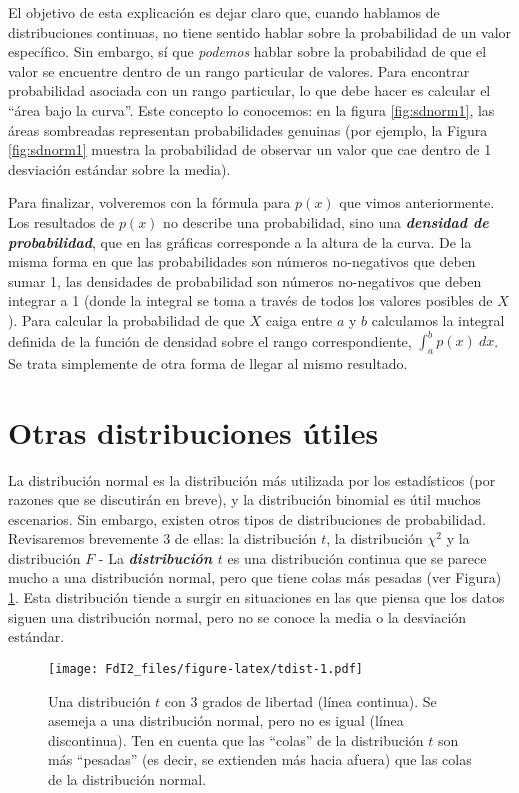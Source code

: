 \documentclass[spanish,]{book}
\begin{document}
El objetivo de esta explicación es dejar claro que, cuando hablamos de
distribuciones continuas, no tiene sentido hablar sobre la probabilidad
de un valor específico. Sin embargo, sí que \emph{podemos} hablar sobre
la probabilidad de que el valor se encuentre dentro de un rango
particular de valores. Para encontrar probabilidad asociada con un rango
particular, lo que debe hacer es calcular el ``área bajo la curva''.
Este concepto lo conocemos: en la figura \ref{fig:sdnorm1}, las áreas
sombreadas representan probabilidades genuinas (por ejemplo, la Figura
\ref{fig:sdnorm1} muestra la probabilidad de observar un valor que cae
dentro de 1 desviación estándar sobre la media).

Para finalizar, volveremos con la fórmula para \(p(x)\) que vimos
anteriormente. Los resultados de \(p(x)\) no describe una probabilidad,
sino una \textbf{\emph{densidad de probabilidad}}, que en las gráficas
corresponde a la altura de la curva. De la misma forma en que las
probabilidades son números no-negativos que deben sumar 1, las
densidades de probabilidad son números no-negativos que deben integrar a
1 (donde la integral se toma a través de todos los valores posibles de
\(X\)). Para calcular la probabilidad de que \(X\) caiga entre \(a\) y
\(b\) calculamos la integral definida de la función de densidad sobre el
rango correspondiente, \(\int_a^b p(x) \ dx\). Se trata simplemente de
otra forma de llegar al mismo resultado.

\section{Otras distribuciones útiles}\label{otherdists}

La distribución normal es la distribución más utilizada por los
estadísticos (por razones que se discutirán en breve), y la distribución
binomial es útil muchos escenarios. Sin embargo, existen otros tipos de
distribuciones de probabilidad. Revisaremos brevemente 3 de ellas: la
distribución \(t\), la distribución \(\chi^2\) y la distribución \(F\) -
La \textbf{\emph{distribución \(t\)}} es una distribución continua que
se parece mucho a una distribución normal, pero que tiene colas más
pesadas (ver Figura) \ref{fig:tdist}. Esta distribución tiende a surgir
en situaciones en las que piensa que los datos siguen una distribución
normal, pero no se conoce la media o la desviación estándar.

\begin{figure}
\centering
\texttt{[image: FdI2\_files/figure-latex/tdist-1.pdf]}
\caption{\label{fig:tdist}Una distribución \(t\) con 3 grados de libertad
(línea continua). Se asemeja a una distribución normal, pero no es igual
(línea discontinua). Ten en cuenta que las ``colas'' de la distribución
\(t\) son más ``pesadas'' (es decir, se extienden más hacia afuera) que
las colas de la distribución normal.}
\end{figure}
\end{document}
